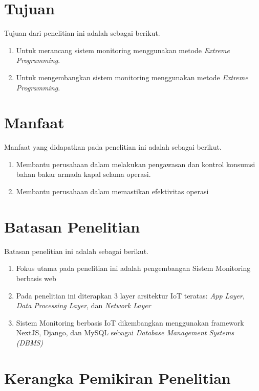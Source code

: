\section{Tujuan}

Tujuan dari penelitian ini adalah sebagai berikut.

\begin{enumerate}
    \item Untuk merancang sistem monitoring menggunakan metode \textit{Extreme Programming}.
    \item Untuk mengembangkan sistem monitoring menggunakan metode \textit{Extreme Programming}.
\end{enumerate}

\section{Manfaat}

Manfaat yang didapatkan pada penelitian ini adalah sebagai berikut.

\begin{enumerate}
    \item Membantu perusahaan dalam melakukan pengawasan dan kontrol konsumsi bahan bakar armada kapal selama operasi.
    \item Membantu perusahaan dalam memastikan efektivitas operasi
\end{enumerate}


\section{Batasan Penelitian}

Batasan penelitian ini adalah sebagai berikut.

\begin{enumerate}
    \item Fokus utama pada penelitian ini adalah pengembangan Sistem Monitoring berbasis web
    \item Pada penelitian ini diterapkan 3 layer arsitektur IoT teratas: \textit{App Layer}, \textit{Data Processing Layer}, dan \textit{Network Layer}
    \item Sistem Monitoring berbasis IoT dikembangkan menggunakan framework
    NextJS, Django, dan MySQL sebagai \textit{Database Management Systems (DBMS)}
\end{enumerate}
\section{Kerangka Pemikiran Penelitian}

